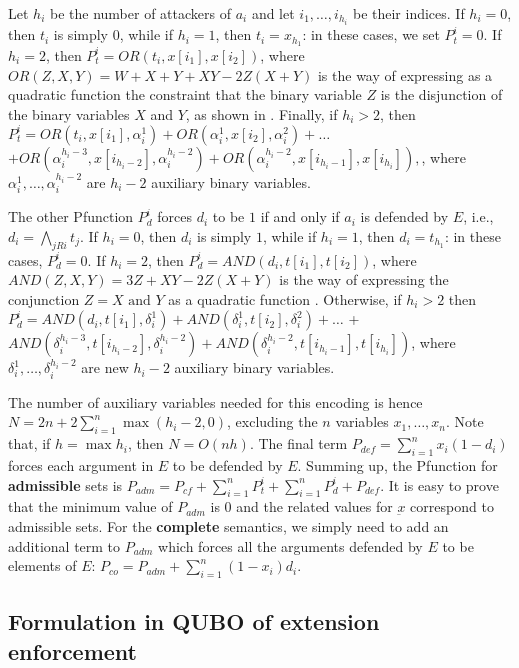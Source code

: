\documentclass[conference]{IEEEtran}
\newcommand{\atts}{\ensuremath{R}\xspace}
\begin{document}
Let $h_i$ be the number of attackers of $a_i$ and let $i_1,\dots,i_{h_i}$ be
their indices. If $h_i=0$, then $t_i$ is simply $0$, while if $h_i=1$, then $t_i=x_{h_1}$:
in these cases, we set $P_{t}^i=0$.
If $h_i=2$, then $P_{t}^i=OR(t_i,x[i_1],x[i_2])$, where
$ OR(Z,X,Y)=W+X+Y+XY-2Z(X+Y)$
is the way of expressing as a quadratic function the constraint that the binary variable $Z$ is the disjunction of the binary variables $X$ and $Y$,
as shown in \cite{rosenberg}. Finally, if $h_i>2$, then
$ P_t^i=OR(t_i,x[i_1],\alpha_i^1)+OR(\alpha_i^1,x[i_2],\alpha_i^2)+\dots$
$ +OR(\alpha_i^{h_i-3},x[i_{h_i-2}],\alpha_i^{h_i-2})+
OR(\alpha_i^{h_i-2},x[i_{h_i-1}],x[i_{h_i}]), $, where $\alpha_i^1,\dots,\alpha_i^{h_i-2}$ are $h_i-2$ auxiliary binary variables.

The other Pfunction $P_{d}^i$ forces $d_i$ to be $1$ if and only if $a_i$ is defended by $E$, i.e.,
$ d_i = \bigwedge_{j \atts i} t_j $.
If $h_i=0$, then $d_i$ is simply $1$, while if $h_i=1$, then $d_i=t_{h_1}$:
in these cases, $P_{d}^i=0$.
If $h_i=2$, then $P_{d}^i=AND(d_i,t[i_1],t[i_2])$, where
$ AND(Z,X,Y)=3Z+XY-2Z(X+Y) $
is the way of expressing the conjunction $Z=X\mbox{ and }Y$ as a quadratic function 
\cite{rosenberg}. Otherwise, if $h_i>2$ then
$ P_d^i=AND(d_i,t[i_1],\delta_i^1)+AND(\delta_i^1,t[i_2],\delta_i^2)+\dots$
+$ AND(\delta_i^{h_i-3},t[i_{h_i-2}],\delta_i^{h_i-2})+AND(\delta_i^{h_i-2},t[i_{h_i-1}], t[i_{h_i}])$, where $\delta_i^1,\dots,\delta_i^{h_i-2}$ are new $h_i-2$ auxiliary binary variables.

The number of auxiliary variables needed for this encoding is hence $N=2n+2\sum_{i=1}^n \max(h_i-2,0)$, excluding the $n$ variables $x_1,\dots,x_n$. 
Note that, if $h=\max h_i$, then $N=O(nh)$.
The final term $ P_{def}= \sum_{i=1}^n x_i(1-d_i) $
forces each argument in $E$ to be defended by $E$.
Summing up, the Pfunction for \textbf{admissible} sets is
$ P_{adm}=P_{cf}+ \sum_{i=1}^n P_t^i + \sum_{i=1}^n P_d^i 
+ P_{def}$.
It is easy to prove that the minimum value of $P_{adm}$ is $0$ and the related values for $\underbar{x}$ correspond to admissible sets. For the \textbf{complete} semantics, we simply need to add an additional term to $P_{adm}$
which forces all the arguments defended by $E$ to be elements of $E$:
$ P_{co}=P_{adm} + \sum_{i=1}^n (1-x_i)d_i$.

\subsection{Formulation in QUBO of extension enforcement}
\end{document}
